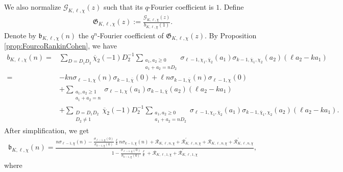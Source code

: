 \documentclass[11pt,letterpaper,reqno]{amsart}
\numberwithin{figure}{section}
\numberwithin{table}{section}
\theoremstyle{definition}
\theoremstyle{plain}
\theoremstyle{definition}
\theoremstyle{definition}
\theoremstyle{remark}
\numberwithin{equation}{section}
\theoremstyle{remark}
\begin{document}
 We also normalize $\mathcal{G}_{K,\ell,\chi}(z)$ such that its $q$-Fourier coefficient is $1.$ Define
\begin{align}
    \mathfrak{G}_{K,\ell,\chi}(z):=\frac{\mathcal{G}_{K,\ell,\chi}(z)}{b_{K,\ell,\chi}(1)}. \label{eq:G-normalized}
\end{align}
Denote by $\mathfrak{b}_{K,\ell,\chi}(n)$ the $q^n$-Fourier coefficient of $\mathfrak{G}_{K,\ell,\chi}(z)$.
By Proposition \ref{prop:FourcoRankinCohen}, we have 
    \begin{align*}
b_{K,\ell,\chi}(n)=&\sum_{D=D_1D_2}\overline{\chi}_2(-1)D_2^{-1}\sum_{\substack{a_1,a_2\geq0\\a_1+a_2=nD_2}}\sigma_{\ell-1,\chi_1,\overline{\chi}_{2}}(a_1)\sigma_{k-1,\overline{\chi}_{1},\chi_2}(a_2)(\ell a_2-k a_1)\\=&-kn\sigma_{\ell-1,\chi}(n)\sigma_{k-1,\overline{\chi}}(0)+\ell n\sigma_{k-1,\overline{\chi}}(n)\sigma_{\ell-1,\chi}(0)\\&+\sum_{\substack{
    a_1,a_2\geq1 \\a_1+a_2=n}}\sigma_{\ell-1,\chi}(a_1)\sigma_{k-1,\overline{\chi}}(a_2)(\ell a_2-ka_1)\\&+\sum_{\substack{D=D_1D_2\\D_2\neq1}}\overline{\chi}_2(-1)D_2^{-1}\sum_{\substack{a_1,a_2\geq0\\a_1+a_2=nD_2}}\sigma_{\ell-1,\chi_1,\overline{\chi}_{2}}(a_1)\sigma_{k-1,\overline{\chi}_{1},\chi_2}(a_2)(\ell a_2-k a_1).
    \end{align*}
After simplification, we get  
\begin{align}
   \mathfrak{b}_{K,\ell,\chi}(n)= \frac{n\sigma_{\ell-1,\chi}(n)-\frac{\sigma_{\ell-1,\chi}(0)}{\sigma_{k-1,\overline{\chi}}(0)}\frac{\ell}{k}n\sigma_{k-1,\overline{\chi}}(n)+\mathcal{R}_{K,\ell,n,\chi}+\mathcal{R}_{K,\ell,n,\chi}^{\prime}+\mathscr{R}_{K,\ell,n,\chi}+\mathscr{R}_{K,\ell,n,\chi}^{\prime}}{1-\frac{\sigma_{\ell-1,\chi}(0)}{\sigma_{k-1,\overline{\chi}}(0)}\frac{\ell}{k}+\mathscr{R}_{K,\ell,1,\chi}+\mathscr{R}^{\prime}_{K,\ell,1,\chi}},\label{eq:fouriercoefficientsb}
\end{align}
where
\end{document}
